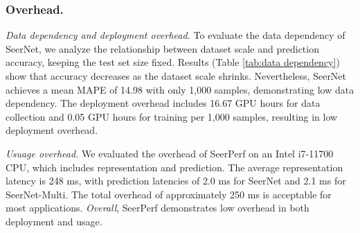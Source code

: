 \subsubsection{Overhead.}
\emph{Data dependency and deployment overhead.}
To evaluate the data dependency of SeerNet, we analyze the relationship between dataset scale and prediction accuracy, keeping the test set size fixed. 
Results (Table \ref{tab:data dependency}) show that accuracy decreases as the dataset scale shrinks. Nevertheless, SeerNet achieves a mean MAPE of 14.98 with only 1,000 samples, demonstrating low data dependency.
The deployment overhead includes 16.67 GPU hours for data collection and 0.05 GPU hours for training per 1,000 samples, resulting in low deployment overhead.

\emph{Usuage overhead.}
We evaluated the overhead of SeerPerf on an Intel i7-11700 CPU, which includes representation and prediction. 
The average representation latency is 248 ms, with prediction latencies of 2.0 ms for SeerNet and 2.1 ms for SeerNet-Multi. The total overhead of approximately 250 ms is acceptable for most applications. \emph{Overall}, SeerPerf demonstrates low overhead in both deployment and usage.


